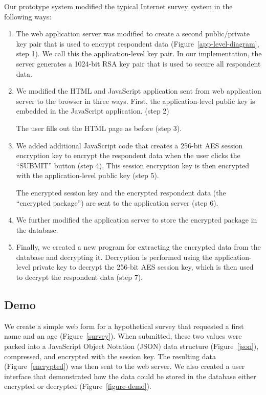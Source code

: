 \documentclass[fleqn,10pt]{wlscirep}
\begin{document}
Our prototype system modified the typical Internet survey system in the following ways:

\begin{enumerate}
\item The web application server was modified to create a second
  public/private key pair that is used to encrypt respondent
  data (Figure~\ref{app-level-diagram}, step 1).  We
  call this the application-level key pair. In our implementation, the
  server generates a 1024-bit RSA key pair that is used to secure all
  respondent data.
\item We modified the HTML and JavaScript application sent from web
  application server to the browser in three ways. First, the
  application-level public key is embedded in the JavaScript
  application. (step 2)
  
 The user fills out the HTML page as before (step 3).

\item We added additional JavaScript code that creates a 256-bit
  AES session encryption key to encrypt the respondent data when the user clicks the
  ``SUBMIT'' button (step 4). This session encryption key is then encrypted
  with the application-level public key (step 5).

   The encrypted session key and the encrypted respondent data (the ``encrypted
  package'') are sent to the  application server (step 6). 
\item We further modified the application server to store the encrypted
  package in the database.
\item Finally, we created a new program for extracting the encrypted
  data from the database and decrypting it. Decryption is performed
  using the application-level private key to decrypt the 256-bit AES
  session key, which is then used to decrypt the respondent data (step
  7).
\end{enumerate}


\subsection{Demo}

We create a simple web form for a hypothetical survey that requested a
first name and an age (Figure~\ref{survey}). When submitted, these two
values were packed into a JavaScript Object Notation (JSON) data
structure (Figure~\ref{json}), compressed, and encrypted with the session key. The
resulting data (Figure~\ref{encrypted}) was then sent to the web
server. We also created a user interface that demonstrated how the
data could be stored in the database either encrypted or decrypted (Figure~\ref{figure-demo}).
\end{document}
